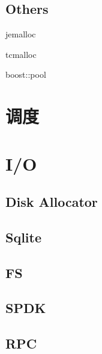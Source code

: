 \subsection{Others}

\begin{enumbox}
\item jemalloc
\item tcmalloc
\item boost::pool
\end{enumbox}

\section{调度}

\section{I/O}

\subsection{Disk Allocator}

\subsection{Sqlite}

\subsection{FS}

\subsection{SPDK}

\subsection{RPC}
